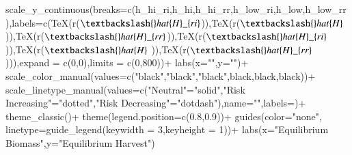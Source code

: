 \documentclass[
  super,
  preprint,
  3p]{elsarticle}
\newenvironment{Shaded}{\begin{snugshade}}{\end{snugshade}}
\newcommand{\AttributeTok}[1]{\textcolor[rgb]{0.40,0.45,0.13}{#1}}
\newcommand{\DecValTok}[1]{\textcolor[rgb]{0.68,0.00,0.00}{#1}}
\newcommand{\FloatTok}[1]{\textcolor[rgb]{0.68,0.00,0.00}{#1}}
\newcommand{\FunctionTok}[1]{\textcolor[rgb]{0.28,0.35,0.67}{#1}}
\newcommand{\NormalTok}[1]{\textcolor[rgb]{0.00,0.23,0.31}{#1}}
\newcommand{\OtherTok}[1]{\textcolor[rgb]{0.00,0.23,0.31}{#1}}
\newcommand{\SpecialCharTok}[1]{\textcolor[rgb]{0.37,0.37,0.37}{#1}}
\newcommand{\StringTok}[1]{\textcolor[rgb]{0.13,0.47,0.30}{#1}}
\theoremstyle{plain}
\theoremstyle{plain}
\theoremstyle{remark}
\begin{document}
\begin{Shaded}
\begin{Highlighting}[]
  \FunctionTok{scale\_y\_continuous}\NormalTok{(}\AttributeTok{breaks=}\FunctionTok{c}\NormalTok{(h\_hi\_ri,h\_hi,h\_hi\_rr,h\_low\_ri,h\_low,h\_low\_rr),}\AttributeTok{labels=}\FunctionTok{c}\NormalTok{(}\FunctionTok{TeX}\NormalTok{(r}\StringTok{\textquotesingle{}($\textbackslash{}hat\{H\}\_\{ri\}$)\textquotesingle{}}\NormalTok{),}\FunctionTok{TeX}\NormalTok{(r}\StringTok{\textquotesingle{}($\textbackslash{}hat\{H\}$  )\textquotesingle{}}\NormalTok{),}\FunctionTok{TeX}\NormalTok{(r}\StringTok{\textquotesingle{}($\textbackslash{}hat\{H\}\_\{rr\}$)\textquotesingle{}}\NormalTok{),}\FunctionTok{TeX}\NormalTok{(r}\StringTok{\textquotesingle{}($\textbackslash{}hat\{H\}\_\{ri\}$)\textquotesingle{}}\NormalTok{),}\FunctionTok{TeX}\NormalTok{(r}\StringTok{\textquotesingle{}($\textbackslash{}hat\{H\}$  )\textquotesingle{}}\NormalTok{),}\FunctionTok{TeX}\NormalTok{(r}\StringTok{\textquotesingle{}($\textbackslash{}hat\{H\}\_\{rr\}$)\textquotesingle{}}\NormalTok{)),}\AttributeTok{expand =} \FunctionTok{c}\NormalTok{(}\DecValTok{0}\NormalTok{,}\DecValTok{0}\NormalTok{),}\AttributeTok{limits =} \FunctionTok{c}\NormalTok{(}\DecValTok{0}\NormalTok{,}\DecValTok{800}\NormalTok{))}\SpecialCharTok{+}
  \FunctionTok{labs}\NormalTok{(}\AttributeTok{x=}\StringTok{""}\NormalTok{,}\AttributeTok{y=}\StringTok{""}\NormalTok{)}\SpecialCharTok{+}
  \FunctionTok{scale\_color\_manual}\NormalTok{(}\AttributeTok{values=}\FunctionTok{c}\NormalTok{(}\StringTok{"black"}\NormalTok{,}\StringTok{"black"}\NormalTok{,}\StringTok{"black"}\NormalTok{,}\StringTok{\textquotesingle{}black\textquotesingle{}}\NormalTok{,}\StringTok{\textquotesingle{}black\textquotesingle{}}\NormalTok{,}\StringTok{\textquotesingle{}black\textquotesingle{}}\NormalTok{))}\SpecialCharTok{+}
  \FunctionTok{scale\_linetype\_manual}\NormalTok{(}\AttributeTok{values=}\FunctionTok{c}\NormalTok{(}\StringTok{"Neutral"}\OtherTok{=}\StringTok{"solid"}\NormalTok{,}\StringTok{"Risk Increasing"}\OtherTok{=}\StringTok{"dotted"}\NormalTok{,}\StringTok{"Risk Decreasing"}\OtherTok{=}\StringTok{"dotdash"}\NormalTok{),}\AttributeTok{name=}\StringTok{""}\NormalTok{,}\AttributeTok{labels=}\NormalTok{)}\SpecialCharTok{+}
  \FunctionTok{theme\_classic}\NormalTok{()}\SpecialCharTok{+}
  \FunctionTok{theme}\NormalTok{(}\AttributeTok{legend.position=}\FunctionTok{c}\NormalTok{(}\FloatTok{0.8}\NormalTok{,}\FloatTok{0.9}\NormalTok{))}\SpecialCharTok{+}
  \FunctionTok{guides}\NormalTok{(}\AttributeTok{color=}\StringTok{"none"}\NormalTok{,}
         \AttributeTok{linetype=}\FunctionTok{guide\_legend}\NormalTok{(}\AttributeTok{keywidth =} \DecValTok{3}\NormalTok{,}\AttributeTok{keyheight =} \DecValTok{1}\NormalTok{))}\SpecialCharTok{+}
  \FunctionTok{labs}\NormalTok{(}\AttributeTok{x=}\StringTok{"Equilibrium Biomass"}\NormalTok{,}\AttributeTok{y=}\StringTok{"Equilibrium Harvest"}\NormalTok{)}
\end{Highlighting}
\end{Shaded}
\end{document}
